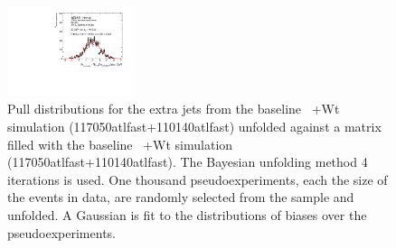 \begin{figure}
\includegraphics[width=0.33\textwidth]{fig/UnfoldPull/SingleSlicePull31.pdf}
%
\caption{Pull distributions for the extra jets from the baseline \ttbar\ +Wt simulation (117050atlfast+110140atlfast) unfolded against a matrix filled with the baseline \ttbar\ +Wt simulation (117050atlfast+110140atlfast). The Bayesian unfolding method 4 iterations is used. One thousand pseudoexperiments, each the size of the events in data, are randomly selected from the sample and unfolded.  A Gaussian is fit to the distributions of biases over the pseudoexperiments.}
\label{fig:appPull1}
\end{figure}
